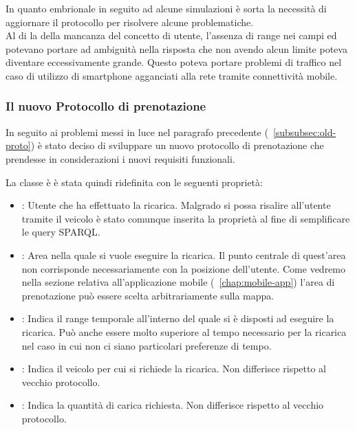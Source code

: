 \noindent
In quanto embrionale in seguito ad alcune simulazioni è sorta la necessità di aggiornare il protocollo per risolvere alcune problematiche. \\ 
Al di la della mancanza del concetto di utente, l'assenza di range nei campi  ed  potevano portare ad ambiguità nella risposta che non avendo alcun limite poteva diventare eccessivamente grande. Questo poteva portare problemi di traffico nel caso di utilizzo di smartphone agganciati alla rete tramite connettività mobile.

\subsubsection{Il nuovo Protocollo di prenotazione}\label{subsubsec:chargerequest}

In seguito ai problemi messi in luce nel paragrafo precedente (~\ref{subsubsec:old-proto}) è stato deciso di sviluppare un nuovo protocollo di prenotazione che prendesse in considerazioni i nuovi requisiti funzionali.

La classe è  è stata quindi ridefinita con le seguenti proprietà:

\begin{itemize}
	\item {}: Utente che ha effettuato la ricarica. Malgrado si possa risalire all'utente tramite il veicolo è stato comunque inserita la proprietà al fine di semplificare le query SPARQL.
	\item {}: Area nella quale si vuole eseguire la ricarica. Il punto centrale di quest'area non corrisponde necessariamente con la posizione dell'utente. Come vedremo nella sezione relativa all'applicazione mobile (~\ref{chap:mobile-app}) l'area di prenotazione può essere scelta arbitrariamente sulla mappa.
	\item {}: Indica il range temporale all'interno del quale si è disposti ad eseguire la ricarica. Può anche essere molto superiore al tempo necessario per la ricarica nel caso in cui non ci siano particolari preferenze di tempo.
	\item {}: Indica il veicolo per cui si richiede la ricarica. Non differisce rispetto al vecchio protocollo.
	\item {}: Indica la quantità di carica richiesta. Non differisce rispetto al vecchio protocollo.
\end{itemize}

